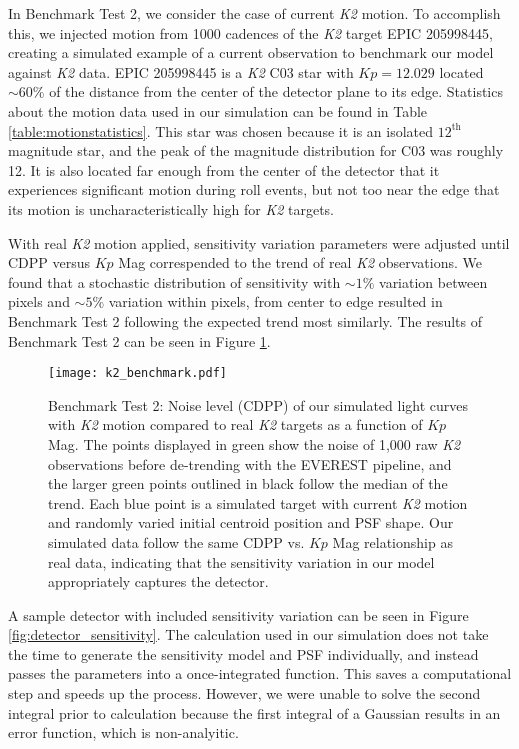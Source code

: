 \documentclass[12pt,preprint]{aastex}
\begin{document}
In Benchmark Test 2, we consider the case of current \textit{K2} motion. To accomplish this, we injected motion from 1000 cadences of the \textit{K2} target EPIC 205998445, creating a simulated example of a current observation to benchmark our model against \textit{K2} data. EPIC 205998445 is a \textit{K2} C03 star with $Kp = 12.029$ located ${\sim}60\%$ of the distance from the center of the detector plane to its edge. Statistics about the motion data used in our simulation can be found in Table \ref{table:motionstatistics}. This star was chosen because it is an isolated $12^{\text{th}}$ magnitude star, and the peak of the magnitude distribution for C03 was roughly 12. It is also located far enough from the center of the detector that it experiences significant motion during roll events, but not too near the edge that its motion is uncharacteristically high for \textit{K2} targets.  

With real \textit{K2} motion applied, sensitivity variation parameters were adjusted until CDPP versus $Kp$ Mag correspended to the trend of real \textit{K2} observations. We found that a stochastic distribution of sensitivity with ${\sim}1\%$ variation between pixels and ${\sim}5\%$ variation within pixels, from center to edge resulted in Benchmark Test 2 following the expected trend most similarly. The results of Benchmark Test 2 can be seen in Figure \ref{fig:1motion}.

\begin{figure}[h]
	\centering
	\texttt{[image: k2\_benchmark.pdf]}
	\caption{Benchmark Test 2: Noise level (CDPP) of our simulated light curves with \textit{K2} motion compared to real \textit{K2} targets as a function of $Kp$ Mag. The points displayed in green show the noise of 1,000 raw \textit{K2} observations before de-trending with the EVEREST pipeline, and the larger green points outlined in black follow the median of the trend. Each blue point is a simulated target with current \textit{K2} motion and randomly varied initial centroid position and PSF shape. Our simulated data follow the same CDPP vs. $Kp$ Mag relationship as real data, indicating that the sensitivity variation in our model appropriately captures the detector.}
	\label{fig:1motion}
\end{figure}

A sample detector with included sensitivity variation can be seen in Figure \ref{fig:detector_sensitivity}. The calculation used in our simulation does not take the time to generate the sensitivity model and PSF individually, and instead passes the parameters into a once-integrated function. This saves a computational step and speeds up the process. However, we were unable to solve the second integral prior to calculation because the first integral of a Gaussian results in an error function, which is non-analyitic.
\end{document}
